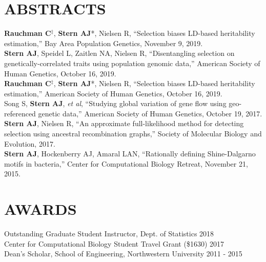 \documentclass[margin, 10pt]{res} %
\begin{document}
\begin{resume}
\section{ABSTRACTS}
{\bf Rauchman C}$^{\ddag}$, {\bf Stern AJ}*, Nielsen R, ``Selection biases LD-based heritability estimation,'' Bay Area Population Genetics, November 9, 2019.\\
{\bf Stern AJ}, Speidel L, Zaitlen NA, Nielsen R, ``Disentangling selection on genetically-correlated traits using population genomic data,'' American Society of Human Genetics, October 16, 2019.\\
{\bf Rauchman C}$^{\ddag}$, {\bf Stern AJ}*, Nielsen R, ``Selection biases LD-based heritability estimation,'' American Society of Human Genetics, October 16, 2019.\\
Song S, {\bf Stern AJ}, {\it et al}, ``Studying global variation of gene flow using geo-referenced genetic data,'' American Society of Human Genetics, October 19, 2017.\\
{\bf Stern AJ}, Nielsen R, ``An approximate full-likelihood method for detecting selection using ancestral recombination graphs,'' Society of Molecular Biology and Evolution, 2017.\\
{\bf Stern AJ}, Hockenberry AJ,  Amaral LAN, “Rationally defining Shine-Dalgarno motifs in bacteria,” Center for Computational Biology Retreat, November 21, 2015.

\section{AWARDS} 

Outstanding Graduate Student Instructor, Dept. of Statistics \hfill 2018\\
Center for Computational Biology Student Travel Grant (\$1630) \hfill 2017\\
Dean’s Scholar, School of Engineering, Northwestern University \hfill 2011 - 2015\\


\end{resume}
\end{document}
